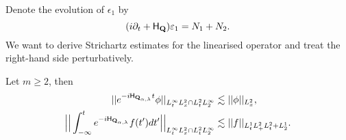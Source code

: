 Denote the evolution of $\epsilon_1$ by 
    \begin{equation}
        (i \partial_t + {\mathsf H}_{{\bf Q}}) \varepsilon_1 
            = N_1 + N_2.
    \end{equation}
We want to derive Strichartz estimates for the linearised operator and treat the right-hand side perturbatively. 

\begin{proposition} 
    Let $m \geq 2$, then 
        \begin{equation}
            \begin{split}
                || e^{- i {\mathsf H}_{{\bf Q}_{\alpha, \lambda}} t} \phi ||_{L^\infty_t L^2_x \cap L^2_t L^\infty_2} 
                    &\lesssim ||\phi||_{L^2_x}, \\
                \Big|\Big| \int_{-\infty}^t e^{-i {\mathsf H}_{{\bf Q}_{\alpha, \lambda}}} f(t') dt' \Big| \Big|_{L^\infty_t L^2_x \cap L^2_t L^\infty_2} 
                    &\lesssim ||f||_{L^1_t L^2_ + L^2_t + L^1_2}.
            \end{split}
        \end{equation}
\end{proposition}